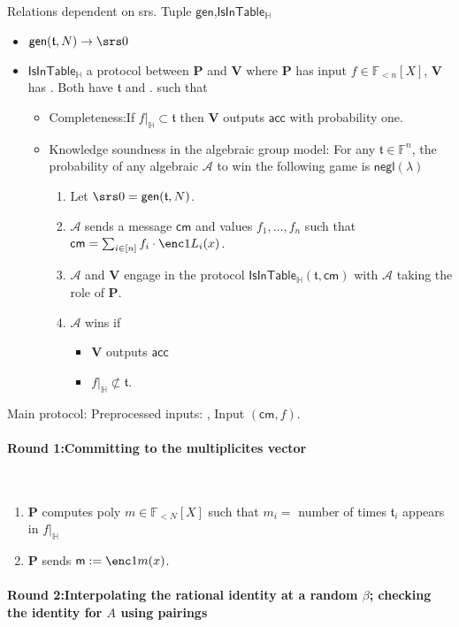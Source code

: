 \documentclass[11pt]{article} %
\newcommand{\F}{\ensuremath{\mathbb F}\xspace}
\newcommand{\adv}{\ensuremath{\mathcal A}\xspace}
\newcommand{\cm}{\ensuremath{\mathsf{cm}}\xspace}
\newcommand{\negl}{\ensuremath{\mathsf{negl}(\lambda)}\xspace}
\newcommand{\acc}{\ensuremath{\mathsf{acc}}\xspace}
\newcommand{\defeq}{:=}
\newcommand{\gen}{\ensuremath{\mathsf{gen}}\xspace}
\newcommand{\prv}{\ensuremath{\mathsf{\mathbf{P}}}\xspace}
\newcommand{\ver}{\ensuremath{\mathsf{\mathbf{V}}}\xspace}
\newcommand{\polysofdeg}[1]{\ensuremath{\F_{< #1}[X]}\xspace}
\newcommand{\sumi}[1]{\sum_{i\in[#1]}}
\newcommand{\restricttoset}[2]{\ensuremath{#1|_{#2}}\xspace}
\newcommand{\isintable}{\ensuremath{\mathsf{IsInTable_{\subspace}}}\xspace}
\newcommand{\subspace}{\ensuremath{\mathbb{H}}\xspace}
\newcommand{\bigspace}{\ensuremath{\mathbb{V}}\xspace}
\newcommand{\witsize}{\ensuremath{n}\xspace}
\newcommand{\tabsize}{\ensuremath{N}\xspace}
\newcommand{\tab}{\ensuremath{\mathfrak{t}}\xspace}
\newcommand{\m}{\ensuremath{\mathsf{m}}\xspace}
\begin{document}
Relations dependent on srs.
Tuple \gen,\isintable
\begin{itemize}
 \item $\gen(\tab,\tabsize)\to \srs0$
 \item $\isintable$ a protocol between \prv and \ver where \prv has input $f\in \polysofdeg{\witsize}$, \ver has .
 Both have \tab and .
 such that
 \begin{itemize}
  \item Completeness:If $\restricttoset{f}{\subspace}\subset \tab$ then \ver outputs \acc with probability one.
  \item Knowledge soundness in the algebraic group model:
   For any $\tab\in\F^\witsize$, the probability of any algebraic \adv to win the following game is \negl

\begin{enumerate}
 \item Let $\srs0=\gen(\tab,\tabsize)$.
 \item \adv sends a message \cm and values $f_1,\ldots, f_\witsize$ such that $\cm=\sumi{\witsize}f_i\cdot \enc1{L_i(x)}$.
 \item \adv and \ver engage in the protocol $\isintable(\tab,\cm)$ with \adv taking the role of \prv.
 \item \adv wins if 
 \begin{itemize}
  \item \ver outputs \acc
  \item $\restricttoset{f}{\subspace}\not\subset \tab$.
 \end{itemize}

\end{enumerate}
\end{itemize}
\end{itemize}
Main protocol:
Preprocessed inputs:
\enc2{Z_\bigspace(x)}, 
Input $(\cm,f)$.
	\paragraph{\textbf{Round 1:Committing to the multiplicites vector}} \ \\
\begin{enumerate}
 \item \prv computes poly $m\in \polysofdeg{\tabsize}$ such that $m_i=$ number of times $\tab_i$ appears in \restricttoset{f}{\subspace}
 \item \prv sends $\m\defeq \enc1{m(x)}$.
 \end{enumerate}
	\paragraph{\textbf{Round 2:Interpolating the rational identity at a random $\beta$; checking the identity for $A$ using pairings}} \ \\
 
\end{document}
